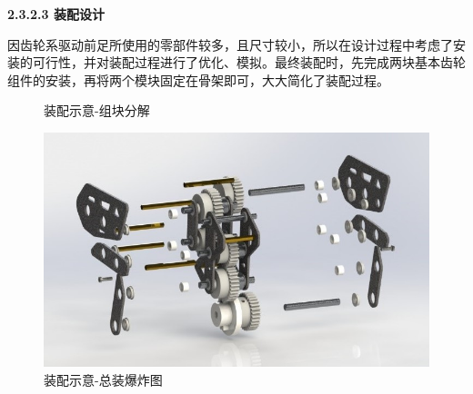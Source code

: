 \documentclass[12pt]{article}
\begin{document}
\begin{CJK}{UTF8}{song}
\textbf{2.3.2.3	装配设计}\par
因齿轮系驱动前足所使用的零部件较多，且尺寸较小，所以在设计过程中考虑了安装的可行性，并对装配过程进行了优化、模拟。最终装配时，先完成两块基本齿轮组件的安装，再将两个模块固定在骨架即可，大大简化了装配过程。
\begin{figure}[H]
{}
\quad
{}
\caption{装配示意-组块分解}
\end{figure}

 \begin{figure}[H]
\centering
\includegraphics[width=.9\textwidth]{chap2//figj.jpg}
\caption{装配示意-总装爆炸图}
\end{figure}


\end{CJK}
\end{document}
